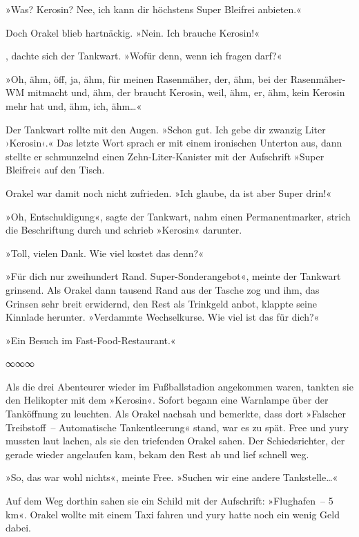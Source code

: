 »Was? Kerosin? Nee, ich kann dir höchstens Super Bleifrei anbieten.«

Doch Orakel blieb hartnäckig. »Nein. Ich brauche Kerosin!«

, dachte sich der Tankwart. »Wofür denn, wenn ich fragen darf?«

»Oh, ähm, öff, ja, ähm, für meinen Rasenmäher, der, ähm, bei der Rasenmäher-WM mitmacht und, ähm, der braucht Kerosin, weil, ähm, er, ähm, kein Kerosin mehr hat und, ähm, ich, ähm…«

Der Tankwart rollte mit den Augen. »Schon gut. Ich gebe dir zwanzig Liter ›Kerosin‹.« Das letzte Wort sprach er mit einem ironischen Unterton aus, dann stellte er schmunzelnd einen Zehn-Liter-Kanister mit der Aufschrift »Super Bleifrei« auf den Tisch.

Orakel war damit noch nicht zufrieden. »Ich glaube, da ist aber Super drin!«

»Oh, Entschuldigung«, sagte der Tankwart, nahm einen Permanentmarker, strich die Beschriftung durch und schrieb »Kerosin« darunter.

»Toll, vielen Dank. Wie viel kostet das denn?«

»Für dich nur zweihundert Rand. Super-Sonderangebot«, meinte der Tankwart grinsend. Als Orakel dann tausend Rand aus der Tasche zog und ihm, das Grinsen sehr breit erwidernd, den Rest als Trinkgeld anbot, klappte seine Kinnlade herunter. »Verdammte Wechselkurse. Wie viel ist das für dich?«

»Ein Besuch im Fast-Food-Restaurant.«

\begin{center}
    ∞∞∞
\end{center}

Als die drei Abenteurer wieder im Fußballstadion angekommen waren, tankten sie den Helikopter mit dem »Kerosin«. Sofort begann eine Warnlampe über der Tanköffnung zu leuchten. Als Orakel nachsah und bemerkte, dass dort »Falscher Treibstoff~– Automatische Tankentleerung« stand, war es zu spät. Free und yury mussten laut lachen, als sie den triefenden Orakel sahen. Der Schiedsrichter, der gerade wieder angelaufen kam, bekam den Rest ab und lief schnell weg.

»So, das war wohl nichts«, meinte Free. »Suchen wir eine andere Tankstelle…«

Auf dem Weg dorthin sahen sie ein Schild mit der Aufschrift: »Flughafen~– 5 km«. Orakel wollte mit einem Taxi fahren und yury hatte noch ein wenig Geld dabei.

